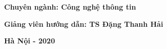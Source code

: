 \documentclass[../main.tex]{subfiles}
\begin{document}
\begin{titlepage}
\begin{center}
\end{center}

\vspace{3cm}
\fontsize{14pt}{14pt} \textbf{Chuyên ngành: Công nghệ thông tin}

\vspace{2cm}
\fontsize{14pt}{14pt} \textbf{Giảng viên hướng dẫn: TS Đặng Thanh Hải}\\

\vfill
\begin{center}
  \fontsize{12pt}{12pt} \textbf{Hà Nội - 2020}
\end{center}

\end{titlepage}
\end{document}
